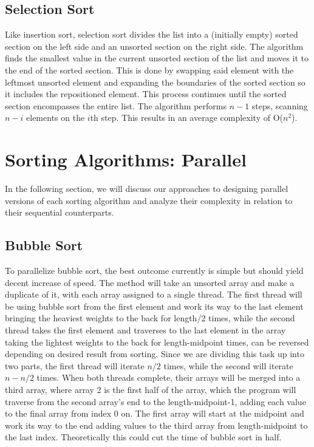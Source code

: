\documentclass{article}
\begin{document}
\subsection{Selection Sort}
Like insertion sort, selection sort divides the list into a (initially empty) sorted section on the left side and an unsorted section on the right side. The algorithm finds the smallest value in the current unsorted section of the list and moves it to the end of the sorted section. This is done by swapping said element with the leftmost unsorted element and expanding the boundaries of the sorted section so it includes the repositioned element. This process continues until the sorted section encompasses the entire list. The algorithm performs $n-1$ steps, scanning $n-i$ elements on the $i$th step. This results in an average complexity of O($n^2$).

\section{Sorting Algorithms: Parallel}
In the following section, we will discuss our approaches to designing parallel versions of each sorting algorithm and analyze their complexity in relation to their sequential counterparts.

\subsection{Bubble Sort}
To parallelize bubble sort, the best outcome currently is simple but should yield decent increase of speed. The method will take an unsorted array and make a duplicate of it, with each array assigned to a single thread. The first thread will be using bubble sort from the first element and work its way to the last element bringing the heaviest weights to the back for length/2 times, while the second thread takes the first element and traverses to the last element in the array taking the lightest weights to the back for length-midpoint times, can be reversed depending on desired result from sorting. Since we are dividing this task up into two parts, the first thread will iterate $n/2$ times, while the second will iterate $n-n/2$ times. When both threads complete, their arrays will be merged into a third array, where array 2 is the first half of the array, which the program will traverse from the second array's end to the length-midpoint-1, adding each value to the final array from index 0 on. The first array will start at the midpoint and work its way to the end adding values to the third array from length-midpoint to the last index. Theoretically this could cut the time of bubble sort in half.
\end{document}
